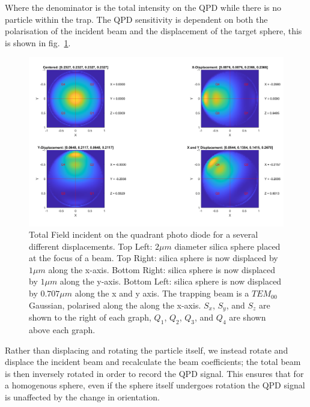 Where the denominator is the total intensity on the QPD while there is 
no particle within the trap. The QPD sensitivity is dependent on both 
the polarisation of the incident beam and the displacement of the target 
sphere, this is shown in fig.~\ref{fig:totalfield}.
\begin{figure}[h!]
	\centering
	\includegraphics[width=\linewidth]{fixed_polarisation.png}
	\captionsetup{margin=0.5cm}
	\caption{Total Field incident on the quadrant photo diode for a several
		different displacements. Top Left: $2\mu m $ diameter silica sphere
		placed at the focus of a  beam. Top Right: silica sphere is now
		displaced by $1 \mu m$ along the x-axis. Bottom Right: silica sphere 
		is now displaced by $1 \mu m$ along the y-axis. Bottom Left: silica 
		sphere is now displaced by $0.707 \mu m$ along the x and y axis. 
		The trapping beam is a $TEM_{00}$ Gaussian, polarised along the 
		along the x-axis. $S_x$, $S_y$, and $S_z$ are shown to the right of 
		each graph, $Q_1$, $Q_2$, $Q_3$, and $Q_4$ are shown above each graph.}
	\label{fig:totalfield}
\end{figure}

Rather than displacing and rotating the particle itself, we instead rotate 
and displace the incident beam and recalculate the beam coefficients; the 
total beam is then inversely rotated in order to record the QPD signal. This
ensures that for a homogenous sphere, even if the sphere itself undergoes
rotation the QPD signal is unaffected by the change in orientation.

